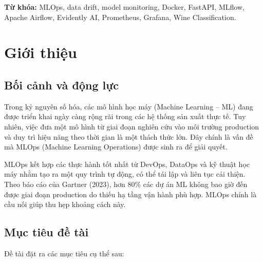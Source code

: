 \documentclass[12pt,a4paper]{report}
\begin{document}
\vspace{0.5cm}
\noindent\textbf{Từ khóa:} MLOps, data drift, model monitoring, Docker, FastAPI, MLflow, Apache Airflow, Evidently AI, Prometheus, Grafana, Wine Classification.

\tableofcontents
\listoffigures
\listoftables

\chapter{Giới thiệu}

\section{Bối cảnh và động lực}

Trong kỷ nguyên số hóa, các mô hình học máy (Machine Learning -- ML) đang được triển khai ngày càng rộng rãi trong các hệ thống sản xuất thực tế. Tuy nhiên, việc đưa một mô hình từ giai đoạn nghiên cứu vào môi trường production và duy trì hiệu năng theo thời gian là một thách thức lớn. Đây chính là vấn đề mà MLOps (Machine Learning Operations) được sinh ra để giải quyết.

MLOps kết hợp các thực hành tốt nhất từ DevOps, DataOps và kỹ thuật học máy nhằm tạo ra một quy trình tự động, có thể tái lập và liên tục cải thiện. Theo báo cáo của Gartner (2023), hơn 80\% các dự án ML không bao giờ đến được giai đoạn production do thiếu hạ tầng vận hành phù hợp. MLOps chính là cầu nối giúp thu hẹp khoảng cách này.

\section{Mục tiêu đề tài}

Đề tài đặt ra các mục tiêu cụ thể sau:
\end{document}
